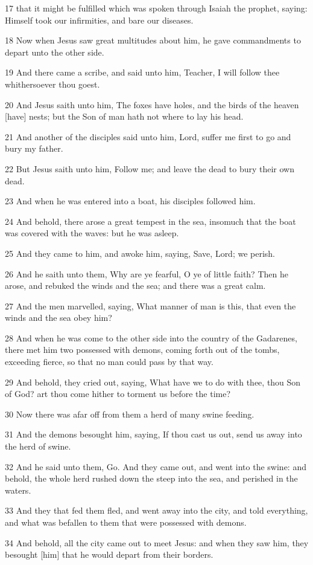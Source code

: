 \par 17 that it might be fulfilled which was spoken through Isaiah the prophet, saying: Himself took our infirmities, and bare our diseases.
\par 18 Now when Jesus saw great multitudes about him, he gave commandments to depart unto the other side.
\par 19 And there came a scribe, and said unto him, Teacher, I will follow thee whithersoever thou goest.
\par 20 And Jesus saith unto him, The foxes have holes, and the birds of the heaven [have] nests; but the Son of man hath not where to lay his head.
\par 21 And another of the disciples said unto him, Lord, suffer me first to go and bury my father.
\par 22 But Jesus saith unto him, Follow me; and leave the dead to bury their own dead.
\par 23 And when he was entered into a boat, his disciples followed him.
\par 24 And behold, there arose a great tempest in the sea, insomuch that the boat was covered with the waves: but he was asleep.
\par 25 And they came to him, and awoke him, saying, Save, Lord; we perish.
\par 26 And he saith unto them, Why are ye fearful, O ye of little faith? Then he arose, and rebuked the winds and the sea; and there was a great calm.
\par 27 And the men marvelled, saying, What manner of man is this, that even the winds and the sea obey him?
\par 28 And when he was come to the other side into the country of the Gadarenes, there met him two possessed with demons, coming forth out of the tombs, exceeding fierce, so that no man could pass by that way.
\par 29 And behold, they cried out, saying, What have we to do with thee, thou Son of God? art thou come hither to torment us before the time?
\par 30 Now there was afar off from them a herd of many swine feeding.
\par 31 And the demons besought him, saying, If thou cast us out, send us away into the herd of swine.
\par 32 And he said unto them, Go. And they came out, and went into the swine: and behold, the whole herd rushed down the steep into the sea, and perished in the waters.
\par 33 And they that fed them fled, and went away into the city, and told everything, and what was befallen to them that were possessed with demons.
\par 34 And behold, all the city came out to meet Jesus: and when they saw him, they besought [him] that he would depart from their borders.


